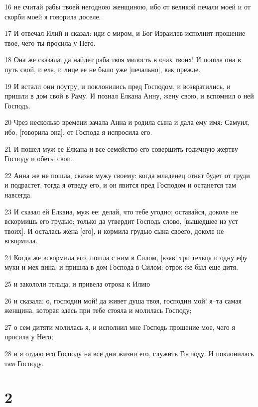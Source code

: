 \par 16 не считай рабы твоей негодною женщиною, ибо от великой печали моей и от скорби моей я говорила доселе.
\par 17 И отвечал Илий и сказал: иди с миром, и Бог Израилев исполнит прошение твое, чего ты просила у Него.
\par 18 Она же сказала: да найдет раба твоя милость в очах твоих! И пошла она в путь свой, и ела, и лице ее не было уже [печально], как прежде.
\par 19 И встали они поутру, и поклонились пред Господом, и возвратились, и пришли в дом свой в Раму. И познал Елкана Анну, жену свою, и вспомнил о ней Господь.
\par 20 Чрез несколько времени зачала Анна и родила сына и дала ему имя: Самуил, ибо, [говорила она], от Господа я испросила его.
\par 21 И пошел муж ее Елкана и все семейство его совершить годичную жертву Господу и обеты свои.
\par 22 Анна же не пошла, сказав мужу своему: когда младенец отнят будет от груди и подрастет, тогда я отведу его, и он явится пред Господом и останется там навсегда.
\par 23 И сказал ей Елкана, муж ее: делай, что тебе угодно; оставайся, доколе не вскормишь его грудью; только да утвердит Господь слово, [вышедшее из уст твоих]. И осталась жена [его], и кормила грудью сына своего, доколе не вскормила.
\par 24 Когда же вскормила его, пошла с ним в Силом, [взяв] три тельца и одну ефу муки и мех вина, и пришла в дом Господа в Силом; отрок же был еще дитя.
\par 25 и закололи тельца; и привела отрока к Илию
\par 26 и сказала: о, господин мой! да живет душа твоя, господин мой! я--та самая женщина, которая здесь при тебе стояла и молилась Господу;
\par 27 о сем дитяти молилась я, и исполнил мне Господь прошение мое, чего я просила у Него;
\par 28 и я отдаю его Господу на все дни жизни его, служить Господу. И поклонилась там Господу.

\chapter{2}

